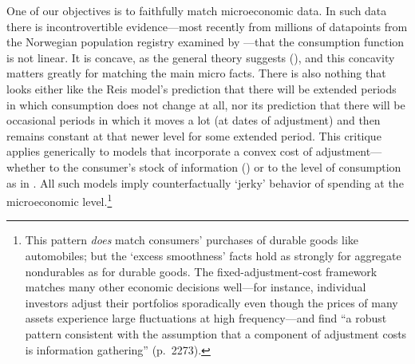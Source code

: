 \documentclass[titlepage]{\econtex}\newcommand{\texname}{cAndCwithStickyE}
\begin{document}
One of our objectives is to faithfully match microeconomic data.  In such data there is incontrovertible evidence---most recently from millions of datapoints from the Norwegian population registry examined by \cite{fhnMPC}---that the consumption function is not linear.  It is concave, as the general theory suggests (\cite{carroll&kimball:concavity}), and this concavity matters greatly for matching the main micro facts.  There is also nothing that looks  either like the Reis model's prediction that there will be extended periods in which consumption does not change at all, nor its prediction that there will be occasional periods in which it moves a lot (at dates of adjustment) and then remains constant at that newer level for some extended period.  This critique applies generically to models that incorporate a convex cost of adjustment---whether to the consumer's stock of information (\cite{reis:inattentive}) or to the level of consumption as in \cite{chettySzeidl:cCommitmentsEcta}.  All such models imply counterfactually `jerky' behavior of spending at the microeconomic level.\footnote{This pattern {\it does} match consumers' purchases of durable goods like automobiles; but the `excess smoothness' facts hold as strongly for aggregate nondurables as for durable goods.  The fixed-adjustment-cost framework matches many other economic decisions well---for instance, individual investors adjust their portfolios sporadically even though the prices of many assets experience large fluctuations at high frequency---and \cite{alvarezGuisoLippi:DurCons} find ``a robust pattern consistent with the assumption that a component of adjustment costs is information gathering'' (p.~2273).}
\end{document}
